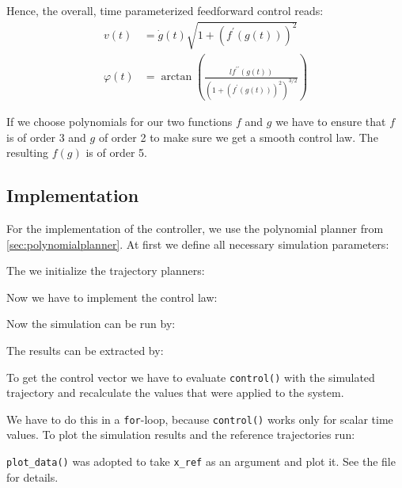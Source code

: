 \documentclass[a4paper,11pt,headings=standardclasses,parskip=half]{scrartcl}
\newcommand{\listcode}[3]{}
\newcommand{\listcodeffcontrol}[2]{\listcode{#1}{#2}{../sim/02_car_feedforward_control.py}}
\begin{document}
Hence, the overall, time parameterized feedforward control reads:
\begin{subequations}
\label{eq:controllaw}
\begin{align}
v(t) &= \dot g(t) \sqrt{1 + (f^\prime(g(t)))^2}\\
\varphi(t) &= \arctan\left(\frac{lf^{\prime\prime}(g(t))}{\left(1 + (f^\prime(g(t)))^2\right)^{3/2}}\right)
\end{align}
\end{subequations}

If we choose polynomials for our two functions $f$ and $g$ we have to ensure that $f$ is of order 3 and $g$ of order 2 to make sure we get a smooth control law. The resulting $f(g)$ is of order 5.
\subsection{Implementation}
For the implementation of the controller, we use the polynomial planner from \ref{sec:polynomialplanner}.
At first we define all necessary simulation parameters:
\listcodeffcontrol{21}{27}
The we initialize the trajectory planners:
\listcodeffcontrol{30}{45}
Now we have to implement the control law:
\listcodeffcontrol{70}{95}
Now the simulation can be run by:
\listcodeffcontrol{298}{298}
The results can be extracted by:
\listcodeffcontrol{299}{299}
To get the control vector we have to evaluate \texttt{control()} with the simulated trajectory and recalculate the values that were applied to the system. 
\listcodeffcontrol{300}{302}
We have to do this in a \texttt{for}-loop, because \texttt{control()} works only for scalar time values.
To plot the simulation results and the reference trajectories run:
\listcodeffcontrol{307}{318}
\texttt{plot\_data()} was adopted to take \texttt{x\_ref} as an argument and plot it. See the file for details.
\end{document}
